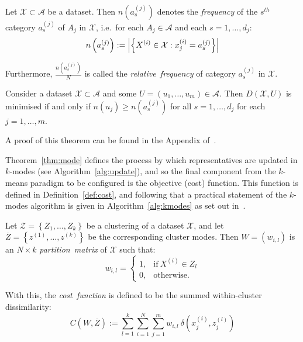 \begin{definition}\label{def:rel-freq}
    Let \(\mathcal{X} \subset \mathcal{A}\) be a dataset. Then
    \(n\left(a_s^{(j)}\right)\) denotes the \emph{frequency} of the \(s^{th}\)
    category \(a_s^{(j)}\) of \(A_j\) in \(\mathcal{X}\), i.e.\ for each \(A_j
    \in \mathcal{A}\) and each \(s = 1, \ldots, d_j\):
    \begin{equation}
        n\left(a_s^{(j)}\right) := \abs*{%
            {\left\{X^{(i)} \in \mathcal{X}: x_j^{(i)} = a_s^{(j)}\right\}}
        }
    \end{equation}
	
    Furthermore, \(\frac{n\left(a_s^{(j)}\right)}{N}\) is called the
    \emph{relative~frequency} of category \(a_s^{(j)}\) in \(\mathcal{X}\).
\end{definition}

\begin{theorem}\label{thm:mode}
    Consider a dataset \(\mathcal{X} \subset \mathcal{A}\) and some \(U = (u_1,
    \ldots, u_m) \in \mathcal{A}\). Then \(D(\mathcal{X}, U)\) is minimised if
    and only if \(n\left(u_j\right) \geq n\left(a_s^{(j)}\right)\) for all
    \(s=1, \ldots, d_j\) for each \(j = 1, \ldots, m\).

    A proof of this theorem can be found in the Appendix of~\cite{Huang1998}.
\end{theorem}

%

Theorem~\ref{thm:mode} defines the process by which representatives are updated
in \(k\)-modes (see Algorithm~\ref{alg:update}), and so the final component from
the \(k\)-means paradigm to be configured is the objective (cost) function. This
function is defined in Definition~\ref{def:cost}, and following that a practical
statement of the \(k\)-modes algorithm is given in Algorithm~\ref{alg:kmodes} as
set out in~\cite{Huang1998}.

\begin{definition}\label{def:cost}
    Let \(\mathcal{Z} = \left\{Z_1, \ldots, Z_k\right\}\) be a clustering of a
    dataset \(\mathcal{X}\), and let \(\overline Z = \left\{z^{(1)},
    \ldots, z^{(k)}\right\}\) be the corresponding cluster modes. Then \(W =
    \left(w_{i, l}\right)\) is an \(N \times k\) \emph{partition~matrix} of
    \(\mathcal{X}\) such that:
    \[
        w_{i, l} = \begin{cases}
                     1, & \text{if} \ X^{(i)} \in Z_l\\
                     0, & \text{otherwise.}
                   \end{cases}
    \]

    With this, the \emph{cost~function} is defined to be the summed
    within-cluster dissimilarity:
    \begin{equation}\label{eq:cost}
        C\left(W, \overline Z\right) := \sum_{l=1}^{k} \sum_{i=1}^{N}
        \sum_{j=1}^{m} w_{i,l} \ \delta\left(x_j^{(i)}, z_j^{(l)}\right)
    \end{equation}
\end{definition}

